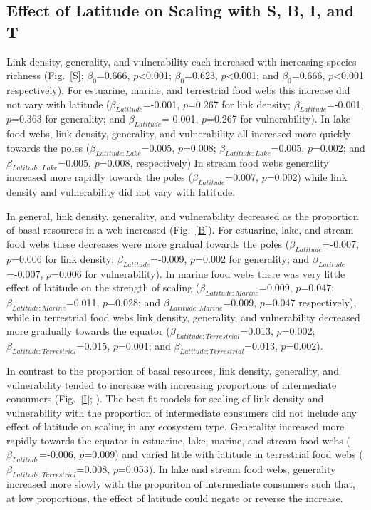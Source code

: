 \documentclass[12pt]{article}
\begin{document}
\subsection*{Effect of Latitude on Scaling with S, B, I, and T}

Link density, generality, and vulnerability each increased with increasing
species richness (Fig.~\ref{S}; $\beta_0$=0.666, $p$\textless0.001; $\beta_0$=0.623,
$p$\textless0.001; and $\beta_0$=0.666, $p$\textless0.001 respectively).  For estuarine,
marine, and terrestrial food webs this increase did not vary with latitude
($\beta_{Latitude}$=-0.001, $p$=0.267 for link density; $\beta_{Latitude}$=-0.001, $p$=0.363 for generality;
and $\beta_{Latitude}$=-0.001, $p$=0.267 for vulnerability). In lake food webs, link density,
generality, and vulnerability all increased more quickly towards the poles
($\beta_{Latitude:Lake}$=0.005, $p$=0.008; $\beta_{Latitude:Lake}$=0.005,
$p$=0.002; and $\beta_{Latitude:Lake}$=0.005, $p$=0.008, respectively) In
stream food webs generality increased more rapidly towards the poles 
($\beta_{Latitude}$=0.007, $p$=0.002) while link density and vulnerability did not vary with latitude.


In general, link density, generality, and vulnerability decreased as the
proportion of basal resources in a web increased (Fig.~\ref{B}). For
estuarine, lake, and stream food webs these decreases were more gradual towards the
poles ($\beta_{Latitude}$=-0.007, $p$=0.006 for link density;
$\beta_{Latitude}$=-0.009, $p$=0.002 for generality; and
$\beta_{Latitude}$=-0.007, $p$=0.006 for vulnerability).
In marine food webs there was very little effect of latitude on
the strength of scaling ($\beta_{Latitude:Marine}$=0.009, $p$=0.047; 
$\beta_{Latitude:Marine}$=0.011, $p$=0.028; 
and $\beta_{Latitude:Marine}$=0.009, $p$=0.047 respectively),
while in terrestrial food webs link density, generality, and vulnerability
decreased more gradually towards the 
equator ($\beta_{Latitude:Terrestrial}$=0.013, $p$=0.002; 
$\beta_{Latitude:Terrestrial}$=0.015, $p$=0.001; 
and $\beta_{Latitude:Terrestrial}$=0.013, $p$=0.002).


In contrast to the proportion of basal resources, link density, generality,
and vulnerability tended to increase with increasing proportions of
intermediate consumers (Fig.~\ref{I}; ). The best-fit models for scaling of link
density and vulnerability with the proportion of intermediate consumers did
not include any effect of latitude on scaling in any ecosystem type. Generality
increased more rapidly towards the equator in estuarine, lake, marine, and
stream food webs ($\beta_{Latitude}$=-0.006, $p$=0.009) and varied little with
latitude in terrestrial food webs ($\beta_{Latitude:Terrestrial}$=0.008,
$p$=0.053). In lake and stream food webs, generality increased more slowly
with the proporiton of intermediate consumers such that, at low proportions,
the effect of latitude could negate or reverse the increase.
\end{document}
